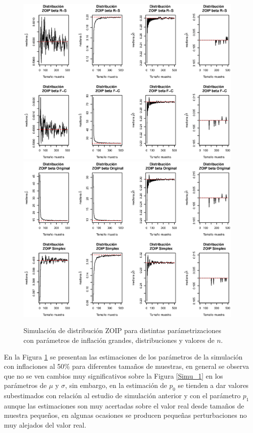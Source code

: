 \begin{figure}
	\begin{center}
		\includegraphics[scale=0.55]{Simulacion_RS_FC_Infla.eps}
		\quad
		\includegraphics[scale=0.55]{Simulacion_Ori_Sim_Infla.eps}	
		\caption{Simulaci\'{o}n de distribuci\'{o}n ZOIP para distintas par\'{a}metrizaciones con pa\-r\'{a}\-me\-tros de inflaci\'{o}n grandes, distribuciones y valores de $n$.}
		\label{Simu_2}
	\end{center}
\end{figure}

En la Figura \ref{Simu_2} se presentan las estimaciones de los par\'{a}metros de la simulaci\'{o}n con inflaciones al 50\% para diferentes tama\~{n}os de muestras, en general se observa que no se ven cambios muy significativos sobre la Figura \ref{Simu_1} en los par\'{a}metros de $\mu$ y $\sigma$, sin embargo, en la estimaci\'{o}n de $p_0$ se tienden a dar valores subestimados con relaci\'{o}n al estudio de simulaci\'{o}n anterior y con el par\'{a}metro $p_1$ aunque las estimaciones son muy acertadas sobre el valor real desde tama\~{n}os de muestra peque\~{n}os, en algunas ocasiones se producen peque\~{n}as perturbaciones no muy alejados del valor real.


